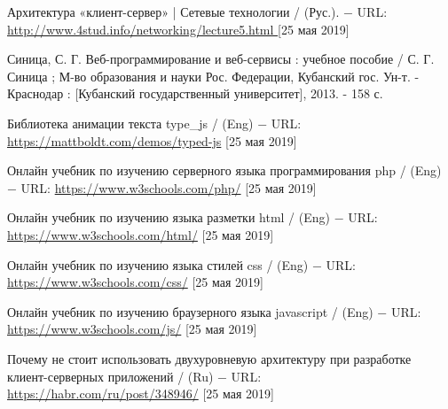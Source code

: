 \documentclass[oneside,final,14pt]{extreport}
\newcommand{\urlTitle}{ $-$ URL: }
\begin{document}
\newpage

\begin{thebibliography}{0}

 Архитектура «клиент-сервер» | Сетевые технологии / (Рус.). \urlTitle \url{http://www.4stud.info/networking/lecture5.html } [25 мая 2019]

Синица, С. Г. Веб-программирование и веб-сервисы : учебное пособие / С. Г. Синица ; М-во образования и науки Рос. Федерации, Кубанский гос. Ун-т. - Краснодар : [Кубанский государственный университет], 2013. - 158 с. 

 Библиотека анимации текста type\_js / (Eng) \urlTitle \url{https://mattboldt.com/demos/typed-js}  [25 мая 2019]

 Онлайн учебник по изучению серверного языка программирования php / (Eng) \urlTitle \url{https://www.w3schools.com/php/}  
[25 мая 2019]

 Онлайн учебник по изучению языка разметки html / (Eng) \urlTitle \url{https://www.w3schools.com/html/} [25 мая 2019]


 Онлайн учебник по изучению языка стилей css / (Eng) \urlTitle \url{https://www.w3schools.com/css/} [25 мая 2019]

 Онлайн учебник по изучению браузерного языка javascript / (Eng) \urlTitle \url{https://www.w3schools.com/js/} [25 мая 2019]

 Почему не стоит использовать двухуровневую архитектуру при разработке клиент-серверных приложений / (Ru) \urlTitle \url{https://habr.com/ru/post/348946/} [25 мая 2019]

\end{thebibliography}
\end{document}
